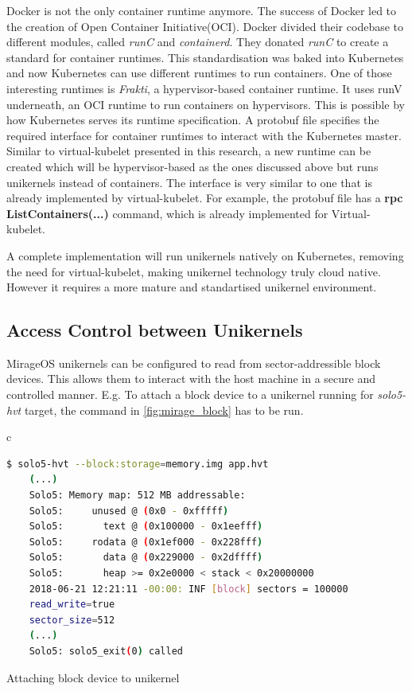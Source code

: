 Docker is not the only container runtime anymore. The success of Docker led to the creation of Open Container Initiative(OCI). Docker divided their codebase to different modules, called \textit{runC} and \textit{containerd}. They donated \textit{runC} to create a standard for container runtimes. This standardisation was baked into Kubernetes and now Kubernetes can use different runtimes to run containers. One of those interesting runtimes is \textit{Frakti}, a hypervisor-based container runtime. It uses runV underneath, an OCI runtime to run containers on hypervisors. This is possible by how Kubernetes serves its runtime specification. A protobuf file \cite{protobuf} specifies the required interface for container runtimes to interact with the Kubernetes master. Similar to virtual-kubelet presented in this research, a new runtime can be created which will be hypervisor-based as the ones discussed above but runs unikernels instead of containers. The interface is very similar to one that is already implemented by virtual-kubelet. For example, the protobuf file has a \textbf{rpc ListContainers(...)} command, which is already implemented for Virtual-kubelet.

A complete implementation will run unikernels natively on Kubernetes, removing the need for virtual-kubelet, making unikernel technology truly cloud native. However it requires a more mature and standartised unikernel environment.

\subsection{Access Control between Unikernels}

MirageOS unikernels can be configured to read from sector-addressible block devices. This allows them to interact with the host machine in a secure and controlled manner. E.g. To attach a block device to a unikernel running for \textit{solo5-hvt} target, the command in \ref{fig:mirage_block} has to be run.

\begin{code}[htpb]
  \centering
  \begin{tabular}{c}
  \begin{lstlisting}[language=bash]
    $ solo5-hvt --block:storage=memory.img app.hvt
    (...)
    Solo5: Memory map: 512 MB addressable:
    Solo5:     unused @ (0x0 - 0xfffff)
    Solo5:       text @ (0x100000 - 0x1eefff)
    Solo5:     rodata @ (0x1ef000 - 0x228fff)
    Solo5:       data @ (0x229000 - 0x2dffff)
    Solo5:       heap >= 0x2e0000 < stack < 0x20000000
    2018-06-21 12:21:11 -00:00: INF [block] sectors = 100000
    read_write=true
    sector_size=512
    (...)
    Solo5: solo5_exit(0) called
\end{lstlisting}
\end{tabular}
\caption{Attaching block device to unikernel}\label{fig:mirage_block}
\end{code}

